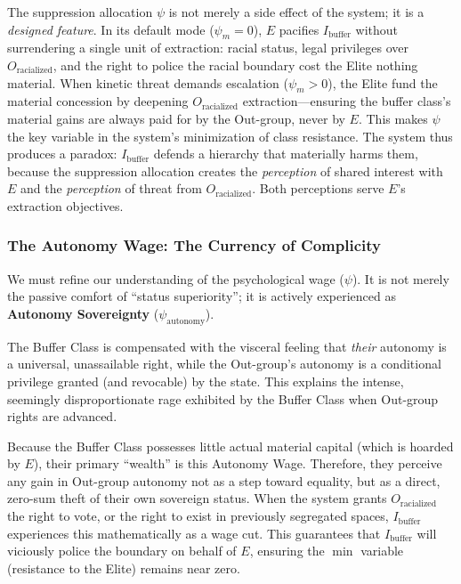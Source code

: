 \documentclass[12pt,openany]{book}
\begin{document}
The suppression allocation $\psi$ is not merely a side effect of the system; it is a \textit{designed feature}. In its default mode ($\psi_m = 0$), $E$ pacifies $I_{\text{buffer}}$ without surrendering a single unit of extraction: racial status, legal privileges over $O_{\text{racialized}}$, and the right to police the racial boundary cost the Elite nothing material. When kinetic threat demands escalation ($\psi_m > 0$), the Elite fund the material concession by deepening $O_{\text{racialized}}$ extraction---ensuring the buffer class's material gains are always paid for by the Out-group, never by $E$. This makes $\psi$ the key variable in the system's minimization of class resistance. The system thus produces a paradox: $I_{\text{buffer}}$ defends a hierarchy that materially harms them, because the suppression allocation creates the \textit{perception} of shared interest with $E$ and the \textit{perception} of threat from $O_{\text{racialized}}$. Both perceptions serve $E$'s extraction objectives.

\subsubsection{The Autonomy Wage: The Currency of Complicity}

We must refine our understanding of the psychological wage ($\psi$). It is not merely the passive comfort of ``status superiority''; it is actively experienced as \textbf{Autonomy Sovereignty} ($\psi_{\text{autonomy}}$).

The Buffer Class is compensated with the visceral feeling that \textit{their} autonomy is a universal, unassailable right, while the Out-group's autonomy is a conditional privilege granted (and revocable) by the state. This explains the intense, seemingly disproportionate rage exhibited by the Buffer Class when Out-group rights are advanced. 

Because the Buffer Class possesses little actual material capital (which is hoarded by $E$), their primary ``wealth'' is this Autonomy Wage. Therefore, they perceive any gain in Out-group autonomy not as a step toward equality, but as a direct, zero-sum theft of their own sovereign status. When the system grants $O_{\text{racialized}}$ the right to vote, or the right to exist in previously segregated spaces, $I_{\text{buffer}}$ experiences this mathematically as a wage cut. This guarantees that $I_{\text{buffer}}$ will viciously police the boundary on behalf of $E$, ensuring the $\min$ variable (resistance to the Elite) remains near zero.
\end{document}
